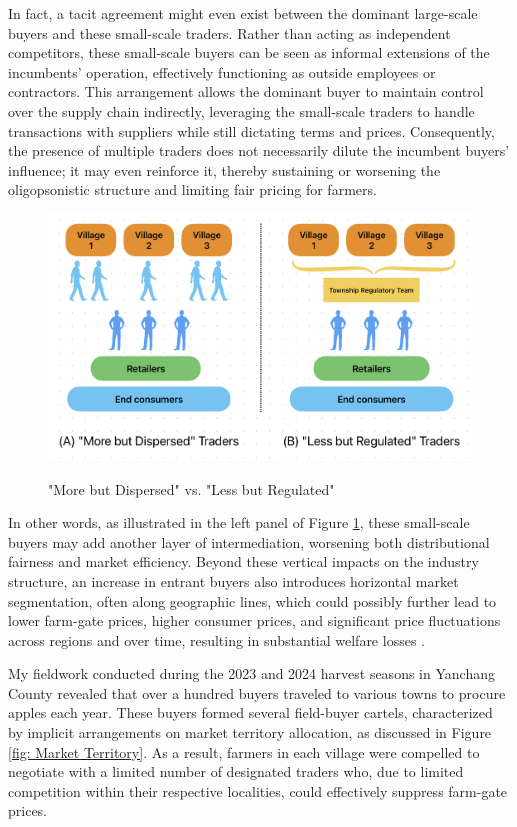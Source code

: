 In fact, a tacit agreement might even exist between the dominant large-scale buyers and these small-scale traders. Rather than acting as independent competitors, these small-scale buyers can be seen as informal extensions of the incumbents' operation, effectively functioning as outside employees or contractors. This arrangement allows the dominant buyer to maintain control over the supply chain indirectly, leveraging the small-scale traders to handle transactions with suppliers while still dictating terms and prices. Consequently, the presence of multiple traders does not necessarily dilute the incumbent buyers' influence; it may even reinforce it, thereby sustaining or worsening the oligopsonistic structure and limiting fair pricing for farmers.

\begin{figure}[hpt]
    \centering
        \caption{"More but Dispersed" vs. "Less but Regulated"}
    \includegraphics[width=\linewidth]{Figures/more_is_less.png}
    \label{fig: more is less}
\end{figure}

In other words, as illustrated in the left panel of Figure \ref{fig: more is less}, these small-scale buyers may add another layer of intermediation, worsening both distributional fairness and market efficiency. Beyond these vertical impacts on the industry structure, an increase in entrant buyers also introduces horizontal market segmentation, often along geographic lines, which could possibly further lead to lower farm-gate prices, higher consumer prices, and significant price fluctuations across regions and over time, resulting in substantial welfare losses \citep{bergquist_McIntosh_2024}.


My fieldwork conducted during the 2023 and 2024 harvest seasons in Yanchang County revealed that over a hundred buyers traveled to various towns to procure apples each year. These buyers formed several field-buyer cartels, characterized by implicit arrangements on market territory allocation, as discussed in Figure \ref{fig: Market Territory}. As a result, farmers in each village were compelled to negotiate with a limited number of designated traders who, due to limited competition within their respective localities, could effectively suppress farm-gate prices.


